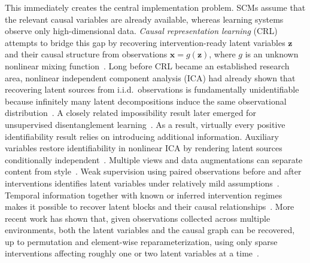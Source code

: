 \documentclass[acmsmall,screen,review,anonymous]{acmart}
\begin{document}
This immediately creates the central implementation problem.
%
SCMs assume that the relevant causal variables are already available, whereas learning systems observe only high-dimensional data.
%
\emph{Causal representation learning} (CRL) attempts to bridge this gap by recovering intervention-ready latent variables $\mathbf{z}$ and their causal structure from observations $\mathbf{x}=g(\mathbf{z})$, where $g$ is an unknown nonlinear mixing function~\citep{scholkopf2021, 10.1145/3501714.3501755}.
%
Long before CRL became an established research area, nonlinear independent component analysis (ICA) had already shown that recovering latent sources from i.i.d.\ observations is fundamentally unidentifiable because infinitely many latent decompositions induce the same observational distribution~\citep{hyvarinen1999nonlinear}.
%
A closely related impossibility result later emerged for unsupervised disentanglement learning~\citep{locatello2019challenging}.
%
As a result, virtually every positive identifiability result relies on introducing additional information.
%
Auxiliary variables restore identifiability in nonlinear ICA by rendering latent sources conditionally independent~\citep{hyvarinen2019auxiliary, khemakhem2020ivae}.
%
Multiple views and data augmentations can separate content from style~\citep{vonkuegelgen2021ssl}.
%
Weak supervision using paired observations before and after interventions identifies latent variables under relatively mild assumptions~\citep{brehmer2022weakly}.
%
Temporal information together with known or inferred intervention regimes makes it possible to recover latent blocks and their causal relationships~\citep{lippe2022citris}.
%
More recent work has shown that, given observations collected across multiple environments, both the latent variables and the causal graph can be recovered, up to permutation and element-wise reparameterization, using only sparse interventions affecting roughly one or two latent variables at a time~\citep{pmlr-v202-ahuja23a, varici2024linear, buchholz2023linear, zhang2023soft, vonkuegelgen2023nonparametric, varici2025score}.
\end{document}
